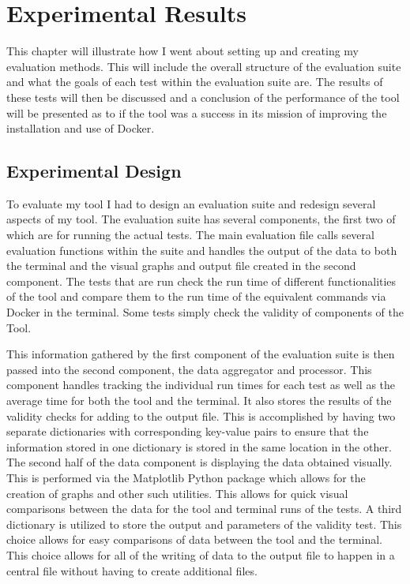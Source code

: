 \chapter{Experimental Results}
\label{ch:experiments}

This chapter will illustrate how I went about setting up and creating my evaluation methods. This will include the overall structure of the evaluation suite and what the goals of each test within the evaluation suite are. The results of these tests will then be discussed and a conclusion of the performance of the tool will be presented as to if the tool was a success in its mission of improving the installation and use of Docker.


\break

\section{Experimental Design}
\label{sec:design}

To evaluate my tool I had to design an evaluation suite and redesign several aspects of my tool. The evaluation suite has several components, the first two of which are for running the actual tests. The main evaluation file calls several evaluation functions within the suite and handles the output of the data to both the terminal and the visual graphs and output file created in the second component. The tests that are run check the run time of different functionalities of the tool and compare them to the run time of the equivalent commands via Docker in the terminal. Some tests simply check the validity of components of the Tool.

This information gathered by the first component of the evaluation suite is then passed into the second component, the data aggregator and processor. This component handles tracking the individual run times for each test as well as the average time for both the tool and the terminal. It also stores the results of the validity checks for adding to the output file. This is accomplished by having two separate dictionaries with corresponding key-value pairs to ensure that the information stored in one dictionary is stored in the same location in the other. The second half of the data component is displaying the data obtained visually. This is performed via the Matplotlib Python package which allows for the creation of graphs and other such utilities. This allows for quick visual comparisons between the data for the tool and terminal runs of the tests. A third dictionary is utilized to store the output and parameters of the validity test. This choice allows for easy comparisons of data between the tool and the terminal. This choice allows for all of the writing of data to the output file to happen in a central file without having to create additional files.


